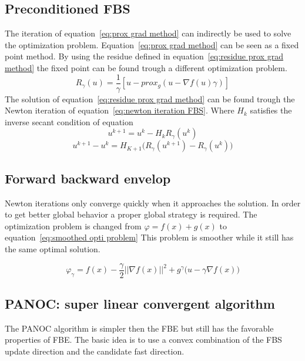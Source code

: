 \documentclass[]{article}
\begin{document}
	\subsection{Preconditioned FBS}
		The iteration of equation~\ref{eq:prox grad method} can indirectly be used to solve the optimization problem. Equation~\ref{eq:prox grad method} can be seen as a fixed point method. By using the residue defined in equation~\ref{eq:residue prox grad method} the fixed point can be found trough a different optimization problem. 
		\begin{equation}
			R_{\gamma}(u)= \frac{1}{\gamma}\left[ u - prox_g( u - \nabla f(u)\gamma) \right]
			\label{eq:residue prox grad method}
		\end{equation}
		The solution of equation~\ref{eq:residue prox grad method} can be found trough the Newton iteration of equation~\ref{eq:newton iteration FBS}. Where $H_k$ satisfies the inverse secant condition of equation~
		\begin{equation}
			u^{k+1} = u^k -H_kR_{\gamma}(u^k)
			\label{eq:newton iteration FBS}
		\end{equation}
		\begin{equation}
			u^{k+1} - u^k = H_{K+1} \Big( R_{\gamma}(u^{k+1})- R_{\gamma}(u^k) \Big)
		\end{equation}
	\subsection{Forward backward envelop}
		Newton iterations only converge quickly when it approaches the solution. In order to get better global behavior a proper global strategy is required. The optimization problem is changed from $\varphi = f(x) + g(x)$ to equation~\ref{eq:smoothed opti problem} This problem is smoother while it still has the same optimal solution.
		
		\begin{equation}
			\varphi_{\gamma} = f(x) - \frac{\gamma}{2}||\nabla f(x)||^2 + g^{\gamma} \big(u-\gamma \nabla f(x) \big)
			\label{eq:smoothed opti problem}
		\end{equation}
		
	\subsection{PANOC: super linear convergent algorithm}
		The PANOC algorithm is simpler then the FBE but still has the favorable properties of FBE. The basic idea is to use a convex combination of the FBS update direction and the candidate fast direction.
		
\end{document}
